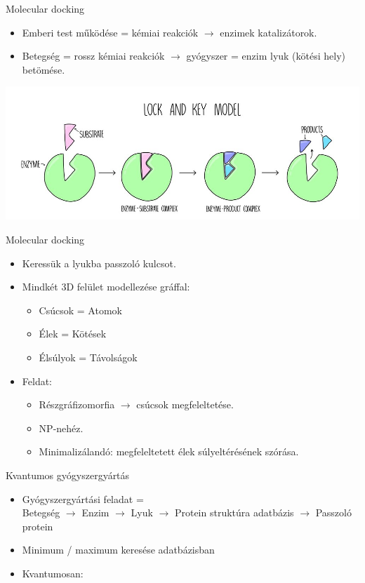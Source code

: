 \documentclass[aspectratio=169]{beamer}
\begin{document}
\begin{frame}{Molecular docking}
\begin{itemize}
    \item Emberi test működése = kémiai reakciók $\rightarrow$ enzimek katalizátorok.
    \item Betegség = rossz kémiai reakciók $\rightarrow$ gyógyszer = enzim lyuk (kötési hely) betömése.
\end{itemize}
\begin{center}
\includegraphics[width=\linewidth]{./dipterv1_figures/lock_and_key_model.jpg}
\end{center}
\end{frame}

\begin{frame}{Molecular docking}
\begin{itemize}
    \item Keressük a lyukba passzoló kulcsot.
    \item Mindkét 3D felület modellezése gráffal:
    \begin{itemize}
        \item Csúcsok = Atomok
        \item Élek = Kötések
        \item Élsúlyok = Távolságok
    \end{itemize}
    \item Feldat:
    \begin{itemize}
        \item Részgráfizomorfia $\rightarrow$ csúcsok megfeleltetése.
        \item NP-nehéz.
        \item Minimalizálandó: megfeleltetett élek súlyeltérésének szórása.
    \end{itemize}
\end{itemize}
\end{frame}

\begin{frame}{Kvantumos gyógyszergyártás}
\begin{itemize}
    \item Gyógyszergyártási feladat = \\
          Betegség $\rightarrow$ Enzim $\rightarrow$ Lyuk $\rightarrow$ Protein struktúra adatbázis $\rightarrow$ Passzoló protein
    \item Minimum / maximum keresése adatbázisban
    \item Kvantumosan:
\end{itemize}
\end{frame}
\end{document}
